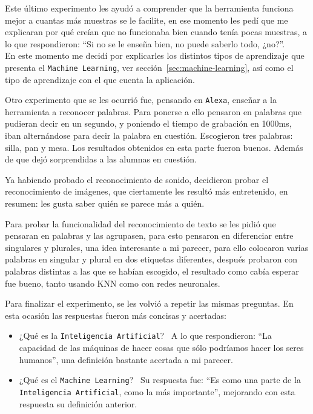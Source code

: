 \documentclass[a4paper, 12pt]{book}
\begin{document}
Este último experimento les ayudó a comprender que la herramienta funciona mejor a cuantas más muestras se le facilite, en ese momento les pedí que me explicaran por qué creían que no funcionaba bien cuando tenía pocas muestras, a lo que respondieron: ``Si no se le enseña bien, no puede saberlo todo, ¿no?''. \\En este momento me decidí por explicarles los distintos tipos de aprendizaje que presenta el \texttt{Machine Learning}, ver sección~\ref{sec:machine-learning}, así como el tipo de aprendizaje con el que cuenta la aplicación.

Otro experimento que se les ocurrió fue, pensando en \texttt{Alexa}, enseñar a la herramienta a reconocer palabras. Para ponerse a ello pensaron en palabras que pudieran decir en un segundo, y poniendo el tiempo de grabación en 1000ms, iban alternándose para decir la palabra en cuestión. Escogieron tres palabras: silla, pan y mesa. Los resultados obtenidos en esta parte fueron buenos. Además de que dejó sorprendidas a las alumnas en cuestión.

Ya habiendo probado el reconocimiento de sonido, decidieron probar el reconocimiento de imágenes, que ciertamente les resultó más entretenido, en resumen: les gusta saber quién se parece más a quién.

Para probar la funcionalidad del reconocimiento de texto se les pidió que pensaran en palabras y las agrupasen, para esto pensaron en diferenciar entre singulares y plurales, una idea interesante a mi parecer, para ello colocaron varias palabras en singular y plural en dos etiquetas diferentes, después probaron con palabras distintas a las que se habían escogido, el resultado como cabía esperar fue bueno, tanto usando KNN como con redes neuronales.

Para finalizar el experimento, se les volvió a repetir las mismas preguntas. En esta ocasión las respuestas fueron más concisas y acertadas:

\begin{itemize}
	\item ¿Qué es la \texttt{Inteligencia Artificial}?~ A lo que respondieron: ``La capacidad de las máquinas de hacer cosas que sólo podríamos hacer los seres humanos'', una definición bastante acertada a mi parecer.
	\item ¿Qué es el \texttt{Machine Learning}?~ Su respuesta fue: ``Es como una parte de la \texttt{Inteligencia Artificial}, como la más importante'', mejorando con esta respuesta su definición anterior.
\end{itemize}
\end{document}
